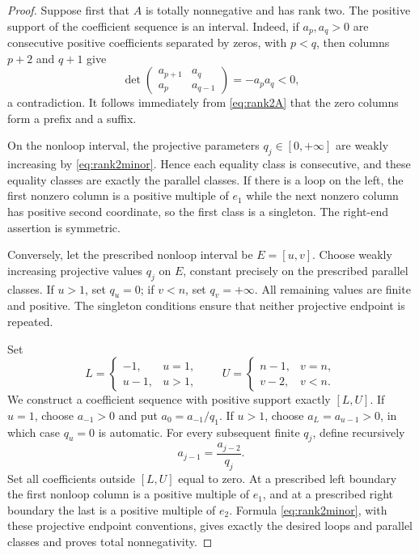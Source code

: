 \documentclass{amsart}
\numberwithin{equation}{section}
\theoremstyle{definition}
\theoremstyle{remark}
\begin{document}
\begin{proof}
Suppose first that $A$ is totally nonnegative and has rank two.  The positive support of the coefficient sequence is an interval.  Indeed, if $a_p,a_q>0$ are consecutive positive coefficients separated by zeros, with $p<q$, then columns $p+2$ and $q+1$ give
\[
 \det\begin{pmatrix}a_{p+1}&a_q\\a_p&a_{q-1}\end{pmatrix}
 =-a_pa_q<0,
\]
a contradiction.  It follows immediately from \eqref{eq:rank2A} that the zero columns form a prefix and a suffix.

On the nonloop interval, the projective parameters $q_j\in[0,+\infty]$ are weakly increasing by \eqref{eq:rank2minor}.  Hence each equality class is consecutive, and these equality classes are exactly the parallel classes.  If there is a loop on the left, the first nonzero column is a positive multiple of $e_1$ while the next nonzero column has positive second coordinate, so the first class is a singleton.  The right-end assertion is symmetric.

Conversely, let the prescribed nonloop interval be $E=[u,v]$.  Choose weakly increasing projective values $q_j$ on $E$, constant precisely on the prescribed parallel classes.  If $u>1$, set $q_u=0$; if $v<n$, set $q_v=+\infty$.  All remaining values are finite and positive.  The singleton conditions ensure that neither projective endpoint is repeated.

Set
\[
 L=\begin{cases}-1,&u=1,\\u-1,&u>1,\end{cases}
 \qquad
 U=\begin{cases}n-1,&v=n,\\v-2,&v<n.\end{cases}
\]
We construct a coefficient sequence with positive support exactly $[L,U]$.  If $u=1$, choose $a_{-1}>0$ and put $a_0=a_{-1}/q_1$.  If $u>1$, choose $a_L=a_{u-1}>0$, in which case $q_u=0$ is automatic.  For every subsequent finite $q_j$, define recursively
\[
 a_{j-1}=\frac{a_{j-2}}{q_j}.
\]
Set all coefficients outside $[L,U]$ equal to zero.  At a prescribed left boundary the first nonloop column is a positive multiple of $e_1$, and at a prescribed right boundary the last is a positive multiple of $e_2$.  Formula \eqref{eq:rank2minor}, with these projective endpoint conventions, gives exactly the desired loops and parallel classes and proves total nonnegativity.
\end{proof}
\end{document}
